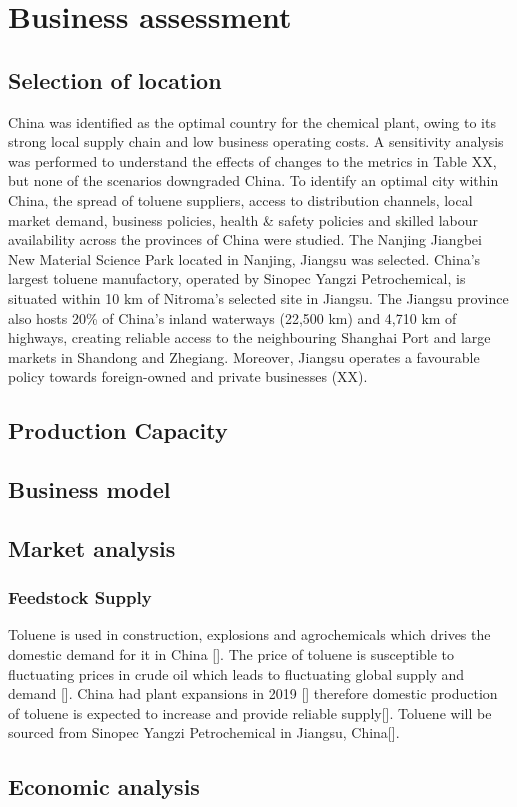 \section{Business assessment}
\label{sec:economics}
\subsection{Selection of location} 



China was identified as the optimal country for the chemical plant, owing to its strong local supply chain and low business operating costs. A sensitivity analysis was performed to understand the effects of changes to the metrics in Table XX, but none of the scenarios downgraded China. To identify an optimal city within China, the spread of toluene suppliers, access to distribution channels, local market demand, business policies, health & safety policies and skilled labour availability across the provinces of China were studied. The Nanjing Jiangbei New Material Science Park located in Nanjing, Jiangsu was selected. China’s largest toluene manufactory, operated by Sinopec Yangzi Petrochemical, is situated within 10 km of Nitroma’s selected site in Jiangsu. The Jiangsu province also hosts 20\% of China’s inland waterways (22,500 km) and 4,710 km of highways, creating reliable access to the neighbouring Shanghai Port and large markets in Shandong and Zhegiang. Moreover, Jiangsu operates a favourable policy towards foreign-owned and private businesses (XX). 



\subsection{Production Capacity}


\subsection{Business model} 

\subsection{Market analysis}

\subsubsection{Feedstock Supply}
Toluene is used in construction, explosions and agrochemicals which drives the domestic demand for it in China []. The price of toluene is susceptible to fluctuating prices in crude oil which leads to fluctuating global supply and demand []. China had plant expansions in 2019 [] therefore domestic production of toluene is expected to increase and provide reliable supply[]. Toluene will be sourced from Sinopec Yangzi Petrochemical in Jiangsu, China[].




\subsection{Economic analysis} 